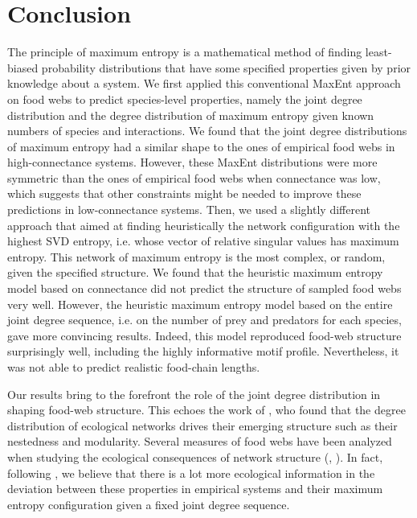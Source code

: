 \section{Conclusion}

The principle of maximum entropy is a mathematical method of finding
least-biased probability distributions that have some specified properties given
by prior knowledge about a system. We first applied this conventional MaxEnt
approach on food webs to predict species-level properties, namely the joint
degree distribution and the degree distribution of maximum entropy given known
numbers of species and interactions. We found that the joint degree
distributions of maximum entropy had a similar shape to the ones of empirical
food webs in high-connectance systems. However, these MaxEnt distributions were
more symmetric than the ones of empirical food webs when connectance was low,
which suggests that other constraints might be needed to improve these
predictions in low-connectance systems. Then, we used a slightly different
approach that aimed at finding heuristically the network configuration with the
highest SVD entropy, i.e. whose vector of relative singular values has maximum
entropy. This network of maximum entropy is the most complex, or random, given
the specified structure. We found that the heuristic maximum entropy model based
on connectance did not predict the structure of sampled food webs very well.
However, the heuristic maximum entropy model based on the entire joint degree
sequence, i.e. on the number of prey and predators for each species, gave more
convincing results. Indeed, this model reproduced food-web structure
surprisingly well, including the highly informative motif profile. Nevertheless,
it was not able to predict realistic food-chain lengths. 

Our results bring to the forefront the role of the joint degree distribution in
shaping food-web structure. This echoes the work of \cite{Fortuna2010Nestedness},
who found that the degree distribution of ecological networks drives their
emerging structure such as their nestedness and modularity. Several measures of
food webs have been analyzed when studying the ecological consequences of
network structure (\cite{McCann2011Food}, \cite{Delmas2019Analysing}). In fact,
following \cite{Williams2011Biology}, we believe that there is a lot more
ecological information in the deviation between these properties in empirical
systems and their maximum entropy configuration given a fixed joint degree
sequence.  

